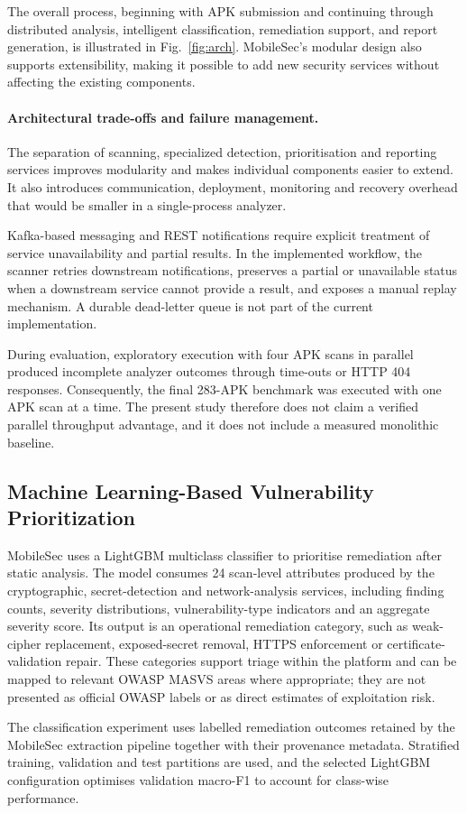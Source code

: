 \documentclass[preprint,12pt, a4paper]{elsarticle}
\begin{document}
The overall process, beginning with APK submission and continuing through distributed analysis, intelligent classification, remediation support, and report generation, is illustrated in Fig.~\ref{fig:arch}. MobileSec’s modular design also supports extensibility, making it possible to add new security services without affecting the existing components.

{\color{blue}\paragraph{Architectural trade-offs and failure management.}
The separation of scanning, specialized detection, prioritisation and reporting services improves modularity and makes individual components easier to extend. It also introduces communication, deployment, monitoring and recovery overhead that would be smaller in a single-process analyzer.

Kafka-based messaging and REST notifications require explicit treatment of service unavailability and partial results. In the implemented workflow, the scanner retries downstream notifications, preserves a partial or unavailable status when a downstream service cannot provide a result, and exposes a manual replay mechanism. A durable dead-letter queue is not part of the current implementation.

During evaluation, exploratory execution with four APK scans in parallel produced incomplete analyzer outcomes through time-outs or HTTP 404 responses. Consequently, the final 283-APK benchmark was executed with one APK scan at a time. The present study therefore does not claim a verified parallel throughput advantage, and it does not include a measured monolithic baseline.}

\subsection{Machine Learning-Based Vulnerability Prioritization}

{\color{blue}MobileSec uses a LightGBM multiclass classifier to prioritise remediation after static analysis. The model consumes 24 scan-level attributes produced by the cryptographic, secret-detection and network-analysis services, including finding counts, severity distributions, vulnerability-type indicators and an aggregate severity score. Its output is an operational remediation category, such as weak-cipher replacement, exposed-secret removal, HTTPS enforcement or certificate-validation repair. These categories support triage within the platform and can be mapped to relevant OWASP MASVS areas where appropriate; they are not presented as official OWASP labels or as direct estimates of exploitation risk.

The classification experiment uses labelled remediation outcomes retained by the MobileSec extraction pipeline together with their provenance metadata. Stratified training, validation and test partitions are used, and the selected LightGBM configuration optimises validation macro-F1 to account for class-wise performance.}
\end{document}
